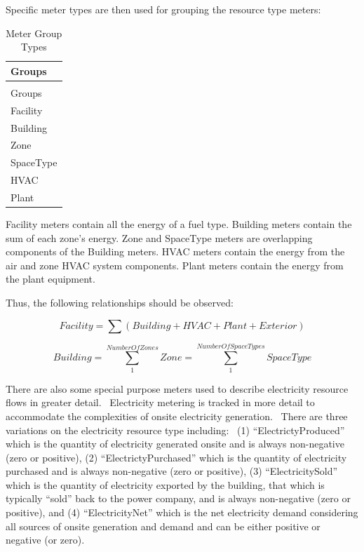 Specific meter types are then used for grouping the resource type meters:

\begin{longtable}[c]{@{}l@{}}
\caption{Meter Group Types \label{table:overall-meter-types}} \tabularnewline
\toprule
Groups \tabularnewline
\midrule
\endfirsthead

\caption[]{Meter Group Types} \tabularnewline
\toprule
Groups \tabularnewline
\midrule
\endhead

Facility \tabularnewline
Building \tabularnewline
Zone \tabularnewline
SpaceType \tabularnewline
HVAC \tabularnewline
Plant \tabularnewline
\bottomrule
\end{longtable}

Facility meters contain all the energy of a fuel type. Building meters contain the sum of each zone's energy. Zone and SpaceType meters are overlapping components of the Building meters. HVAC meters contain the energy from the air and zone HVAC system components. Plant meters contain the energy from the plant equipment.

Thus, the following relationships should be observed:

\begin{equation}
Facility = \sum {\left( {Building + HVAC + Plant + Exterior} \right)}
\end{equation}

\begin{equation}
Building = \sum\limits_1^{NumberOfZones} {Zone} = \sum\limits_1^{NumberOfSpaceTypes} {SpaceType}
\end{equation}

There are also some special purpose meters used to describe electricity resource flows in greater detail.~ Electricity metering is tracked in more detail to accommodate the complexities of onsite electricity generation.~ There are three variations on the electricity resource type including:~ (1) ``ElectrictyProduced'' which is the quantity of electricity generated onsite and is always non-negative (zero or positive), (2) ``ElectrictyPurchased'' which is the quantity of electricity purchased and is always non-negative (zero or positive), (3) ``ElectricitySold'' which is the quantity of electricity exported by the building, that which is typically ``sold'' back to the power company, and is always non-negative (zero or positive), and (4) ``ElectricityNet'' which is the net electricity demand considering all sources of onsite generation and demand and can be either positive or negative (or zero).


